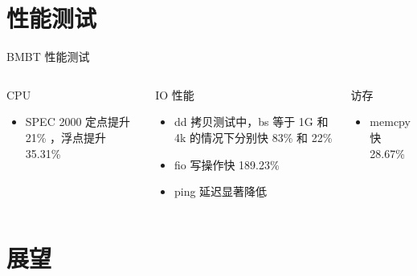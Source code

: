 \documentclass{beamer}
\begin{document}
\section{性能测试}

\begin{frame}{BMBT 性能测试}
	\begin{columns}[T,onlytextwidth]
		\begin{exampleblock}{CPU}
			\begin{itemize}
				\item SPEC 2000 定点提升 21\% ，浮点提升 35.31\%
			\end{itemize}
		\end{exampleblock}

		\begin{exampleblock}{IO 性能}
			\begin{itemize}
				\item dd 拷贝测试中，bs 等于 1G 和 4k 的情况下分别快 83\% 和 22\%
				\item fio 写操作快 189.23\%
				\item ping 延迟显著降低
			\end{itemize}
		\end{exampleblock}

		\begin{exampleblock}{访存}
			\begin{itemize}
				\item memcpy 快 28.67\%
			\end{itemize}
		\end{exampleblock}
	\end{columns}
\end{frame}

\section{展望}
\end{document}
